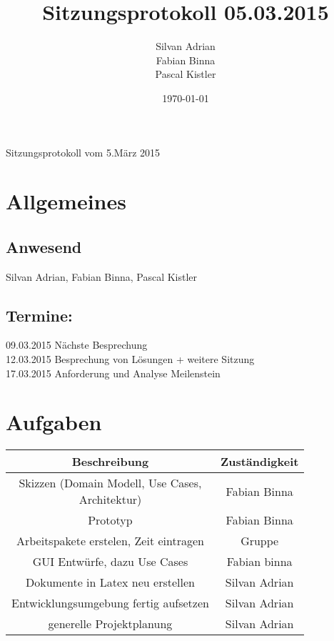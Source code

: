 \documentclass[11pt]{scrartcl}
\title{Sitzungsprotokoll 05.03.2015}
\author{Silvan Adrian \\ Fabian Binna \\ Pascal Kistler}
\date{\today{}}
\begin{document}
{\huge Sitzungsprotokoll vom 5.März 2015}

\section{Allgemeines}
\label{sec:Allgemein}

\subsection{Anwesend}
\label{sec:Anwesend}
Silvan Adrian, Fabian Binna, Pascal Kistler

\subsection{Termine:}
\label{sec:Termine}
09.03.2015 Nächste Besprechung \\
12.03.2015 Besprechung von Lösungen + weitere Sitzung \\
17.03.2015 Anforderung und Analyse Meilenstein
\section{Aufgaben}
\label{sec:Aufgaben}
\begin{tabularx}{\textwidth}{c c }
\textbf{Beschreibung}  & \textbf{Zuständigkeit} \\
\hline
\shortstack{Skizzen (Domain Modell, Use Cases, \\ Architektur)} & Fabian Binna\\
\hline
Prototyp & Fabian Binna \\
\hline
Arbeitspakete erstelen, Zeit eintragen & Gruppe \\
\hline
GUI Entwürfe, dazu Use Cases & Fabian binna \\
\hline
Dokumente in Latex neu erstellen & Silvan Adrian \\
\hline
Entwicklungsumgebung fertig aufsetzen & Silvan Adrian \\
\hline
generelle Projektplanung & Silvan Adrian \\
\end{tabularx}
\end{document}
